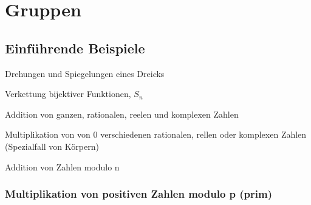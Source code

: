 \documentclass[10pt]{scrbook}
\begin{document}
\section{Gruppen}
\subsection{Einführende Beispiele}

\begin{Bsp}Drehungen und Spiegelungen eines Dreicks\end{Bsp}

\begin{Bsp}Verkettung bijektiver Funktionen, $S_n$\end{Bsp}

\begin{Bsp}Addition von ganzen, rationalen, reelen und komplexen Zahlen\end{Bsp}

\begin{Bsp}Multiplikation von von 0 verschiedenen rationalen, rellen oder komplexen Zahlen (Spezialfall von Körpern)\end{Bsp}

\begin{Bsp}Addition von Zahlen modulo n\end{Bsp}

\subsubsection{Multiplikation von positiven Zahlen modulo p (prim)}
\end{document}
